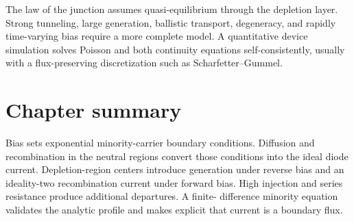 \begin{boundarybox}
The law of the junction assumes quasi-equilibrium through the depletion layer.
Strong tunneling, large generation, ballistic transport, degeneracy, and
rapidly time-varying bias require a more complete model.  A quantitative device
simulation solves Poisson and both continuity equations self-consistently,
usually with a flux-preserving discretization such as Scharfetter--Gummel.
\end{boundarybox}

\section{Chapter summary}

Bias sets exponential minority-carrier boundary conditions.  Diffusion and
recombination in the neutral regions convert those conditions into the ideal
diode current.  Depletion-region centers introduce generation under reverse
bias and an ideality-two recombination current under forward bias.  High
injection and series resistance produce additional departures.  A finite-
difference minority equation validates the analytic profile and makes explicit
that current is a boundary flux.
